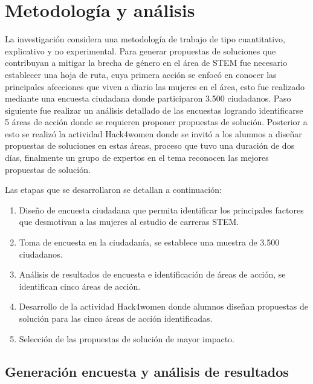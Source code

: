\documentclass[spanish]{textolivre}
\begin{document}
\section{Metodología y análisis}
 
 La investigación considera una metodología de trabajo de tipo cuantitativo, explicativo y no experimental.
Para generar propuestas de soluciones que contribuyan a mitigar la brecha de género en el área de STEM fue necesario establecer una hoja de ruta, cuya primera acción se enfocó en conocer las principales afecciones que viven a diario las mujeres en el área, esto fue realizado mediante una encuesta ciudadana donde participaron 3.500 ciudadanos. Paso siguiente fue realizar un análisis detallado de las encuestas logrando identificarse 5 áreas de acción donde se requieren proponer propuestas de solución. Posterior a esto se realizó la actividad Hack4women donde se invitó a los alumnos a diseñar propuestas de soluciones en estas áreas, proceso que tuvo una duración de dos días, finalmente un grupo de expertos en el tema reconocen las mejores propuestas de solución.

Las etapas que se desarrollaron se detallan a continuación:
 \begin{enumerate}
  \item Diseño de encuesta ciudadana que permita identificar los principales factores que desmotivan a las mujeres al estudio de carreras STEM.
  \item Toma de encuesta en la ciudadanía, se establece una muestra de 3.500 ciudadanos.
  \item Análisis de resultados de encuesta e identificación de áreas de acción, se identifican cinco áreas de acción.
  \item Desarrollo de la actividad Hack4women donde alumnos diseñan propuestas de solución para las cinco áreas de acción identificadas. 
  \item Selección de las propuestas de solución de mayor impacto.
\end{enumerate}

 \subsection{Generación encuesta y análisis de resultados}
 
\end{document}
